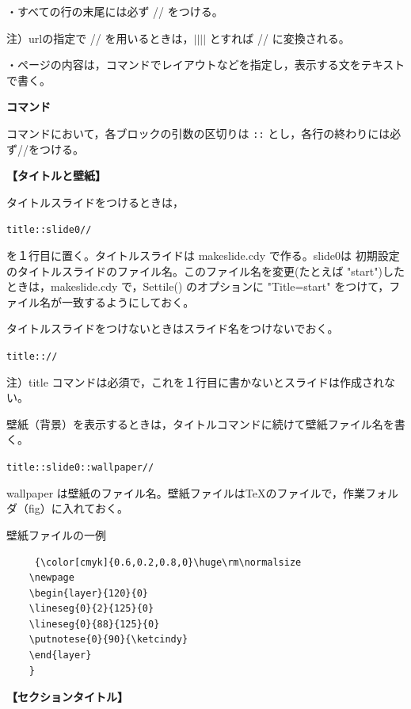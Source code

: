 \documentclass[papersize,a4paper,12pt,uplatex]{jsarticle}
\begin{document}
・すべての行の末尾には必ず // をつける。

\hspace{10mm} 注）urlの指定で // を用いるときは，$||||$ とすれば // に変換される。

・ページの内容は，コマンドでレイアウトなどを指定し，表示する文をテキストで書く。

\vspace{\baselineskip}
{\bf コマンド}

コマンドにおいて，各ブロックの引数の区切りは \verb|::| とし，各行の終わりには必ず//をつける。
 
\vspace{\baselineskip}
 {\bf 【タイトルと壁紙】}
 
 タイトルスライドをつけるときは，
 
 \hspace{10mm}\verb|title::slide0//|
 
 を１行目に置く。タイトルスライドは makeslide.cdy で作る。slide0は 初期設定のタイトルスライドのファイル名。このファイル名を変更(たとえば "start")したときは，makeslide.cdy で，Settile() のオプションに "Title=start" をつけて，ファイル名が一致するようにしておく。
 
 タイトルスライドをつけないときはスライド名をつけないでおく。
 
\hspace{10mm} \verb|title:://|

注）title コマンドは必須で，これを１行目に書かないとスライドは作成されない。

\vspace{\baselineskip}
壁紙（背景）を表示するときは，タイトルコマンドに続けて壁紙ファイル名を書く。
 
 \hspace{10mm}\verb|title::slide0::wallpaper//|
 
wallpaper は壁紙のファイル名。壁紙ファイルはTeXのファイルで，作業フォルダ（fig）に入れておく。

壁紙ファイルの一例
 
\begin{verbatim}
     {\color[cmyk]{0.6,0.2,0.8,0}\huge\rm\normalsize
    \newpage
    \begin{layer}{120}{0}
    \lineseg{0}{2}{125}{0}
    \lineseg{0}{88}{125}{0}
    \putnotese{0}{90}{\ketcindy}
    \end{layer}
    }
\end{verbatim}
 
\vspace{\baselineskip}
{\bf 【セクションタイトル】}
 
\end{document}
